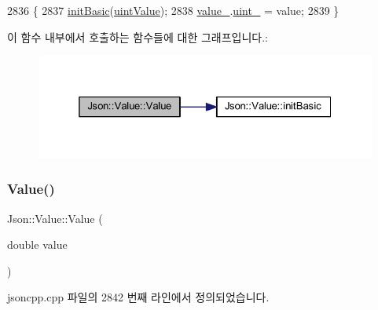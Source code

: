 \begin{DoxyCode}
2836                          \{
2837   \hyperlink{class_json_1_1_value_a32b86b71564157f40f880f5736be822a}{initBasic}(\hyperlink{namespace_json_a7d654b75c16a57007925868e38212b4eaea788d9a3bb00adc6d68d97d43e1ccd3}{uintValue});
2838   \hyperlink{class_json_1_1_value_aef578244546212705b9f81eb84d7e151}{value\_}.\hyperlink{union_json_1_1_value_1_1_value_holder_aab65665dc15a24a29a8e93cdeeaa7e50}{uint\_} = value;
2839 \}
\end{DoxyCode}
이 함수 내부에서 호출하는 함수들에 대한 그래프입니다.\+:\nopagebreak
\begin{figure}[H]
\begin{center}
\leavevmode
\includegraphics[width=325pt]{class_json_1_1_value_a8adda58d5ae17bf7ca6a53bab4a7b69c_cgraph}
\end{center}
\end{figure}
\mbox{\label{class_json_1_1_value_a32228cc84d83200cca8441451997996c}} 
\subsubsection{\texorpdfstring{Value()}{Value()}\hspace{0.1cm}{\footnotesize\ttfamily [6/12]}}
{\footnotesize\ttfamily Json\+::\+Value\+::\+Value (\begin{DoxyParamCaption}\item[{double}]{value }\end{DoxyParamCaption})}



jsoncpp.\+cpp 파일의 2842 번째 라인에서 정의되었습니다.


